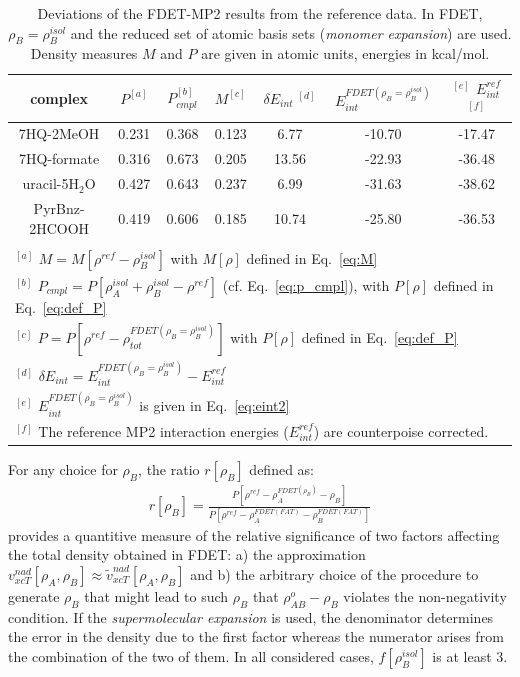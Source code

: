 \documentclass[amsmath,amssymb,preprint,aip,jcp]{revtex4-1}
\begin{document}
\begin{table}
{
\begin{center}
\begin{tabular}{|c|c|c|c|c|c|c|}
\hline
 complex & $P^{[a]}$ & $P_{cmpl}^{[b]}$ & $M^{[c]}$ & $\delta E_{int}\;^{[d]}$ & $E^{FDET(\rho_B=\rho_B^{isol})}_{int}$ & $^{[e]}$ $E_{int}^{ref}$ $^{[f]}$ \\ \hline
7HQ-2MeOH & 0.231 & 0.368 & 0.123 & 6.77 & -10.70 & -17.47 \\ \hline
7HQ-formate & 0.316 & 0.673 & 0.205 & 13.56 & -22.93 & -36.48 \\ \hline
uracil-5H$_2$O & 0.427 & 0.643 & 0.237 & 6.99 & -31.63 & -38.62 \\ \hline
PyrBnz-2HCOOH & 0.419 & 0.606 & 0.185 & 10.74 & -25.80 & -36.53 \\ \hline
\multicolumn{7}{c}{ } \\
\multicolumn{7}{l}{$^{[a]}$ $M=M[\rho^{ref} - \rho^{isol}_{B}]$ with $M[\rho]$ defined in Eq.~\ref{eq:M}}\\
\multicolumn{7}{l}{$^{[b]}$ $P_{cmpl}=P[\rho_A^{isol}+\rho_B^{isol} - \rho^{ref}]$ (cf. Eq.~\ref{eq:p_cmpl}), with $P[\rho]$ defined in Eq.~\ref{eq:def_P}}\\
\multicolumn{7}{l}{$^{[c]}$ $P=P[\rho^{ref} - \rho_{tot}^{FDET(\rho_B=\rho_B^{isol})}]$ with $P[\rho]$ defined in Eq.~\ref{eq:def_P}}\\
\multicolumn{7}{l}{$^{[d]}$ $\delta E_{int}=E^{FDET(\rho_B=\rho_B^{isol})}_{int}-E_{int}^{ref}$} \\
\multicolumn{7}{l}{$^{[e]}$ $E^{FDET(\rho_B=\rho_B^{isol})}_{int}$ is given in Eq.~\ref{eq:eint2}}\\
\multicolumn{7}{l}{$^{[f]}$ The reference MP2 interaction energies ($E_{int}^{ref}$) are counterpoise corrected.}
\end{tabular}
\end{center}
}%
\caption{Deviations of the FDET-MP2 results from the reference data. In FDET, $\rho_B=\rho_B^{isol}$ and the reduced set of atomic basis sets ({\it monomer expansion}) are used. 
Density measures $M$ and $P$ are given in atomic units, energies in kcal/mol.
}
\label{table:ME_isol}
\end{table}

For any choice for $\rho_B$,
the ratio $r[\rho_B]$ defined as:
\begin{eqnarray}
r[\rho_B]=\frac{P[\rho^{ref} - \rho_{A}^{FDET(\rho_{B})}-\rho_{B}]}{P[\rho^{ref} - \rho_{A}^{FDET(FAT)}-\rho_{B}^{FDET(FAT)}]}
\end{eqnarray}
provides a quantitive measure of the relative significance of two factors affecting the total density obtained in FDET:
a) the approximation $v_{xcT}^{nad}[\rho_A,\rho_B]\approx \tilde{v}_{xcT}^{nad}[\rho_A,\rho_B]$ and b) the arbitrary choice of the procedure to generate $\rho_B$ that might lead to such $\rho_B$ that 
$\rho_{AB}^o-\rho_B$ violates the non-negativity condition.
If the {\it supermolecular expansion} is used, the denominator determines the error in the density due to the first factor whereas the numerator arises from the combination of the two of them.
In all considered cases, $f[\rho_B^{isol}]$ is at least 3.
\end{document}
